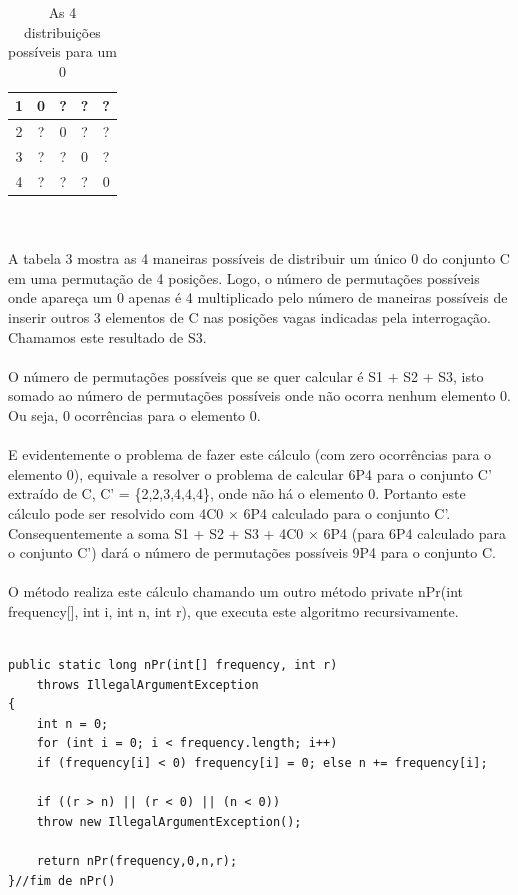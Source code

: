 \documentclass[a4paper,12pt,openany]{book}
\begin{document}
\begin{table}[h]
	\begin{center}
		\begin{tabular}{|c||c|c|c|c|}
			\hline
			1 & 0 & ? & ? & ?\\
			\hline
			2 & ? & 0 & ? & ? \\
			\hline
			3 & ? & ? & 0 & ? \\ 
			\hline
			4 & ? & ? & ? & 0 \\ 
			\hline
		\end{tabular}
	\end{center}
	\caption{As 4 distribuições possíveis para um 0}
\end{table}
\\ 
\\
A tabela 3 mostra as 4 maneiras possíveis de distribuir um único 0 do conjunto C em uma permutação de 4 posições. Logo, o número de permutações possíveis onde apareça um 0 apenas é 4 multiplicado pelo número de maneiras possíveis de inserir outros 3 elementos de C nas posições vagas indicadas pela interrogação. Chamamos este resultado de S3.
\\
\\
O número de permutações possíveis que se quer calcular é S1 + S2 + S3, isto somado ao número de permutações possíveis onde não ocorra nenhum elemento 0. Ou seja, 0 ocorrências para o elemento 0.
\\
\\
E evidentemente o problema de fazer este cálculo (com zero ocorrências para o elemento 0), equivale a resolver o problema de calcular 6P4 para o conjunto C' extraído de C, C' = \{2,2,3,4,4,4\}, onde não há o elemento 0. Portanto este cálculo pode ser resolvido com 4C0 $ \times $ 6P4 calculado para o conjunto C'. Consequentemente a soma S1 + S2 + S3 + 4C0 $ \times $ 6P4 (para 6P4 calculado para o conjunto C') dará o número de permutações possíveis 9P4 para o conjunto C.
\\
\\
O método realiza este cálculo chamando um outro método private nPr(int frequency[], int i, int n, int r), que executa este algoritmo recursivamente.
\\
\\
\begin{lstlisting}
public static long nPr(int[] frequency, int r)
	throws IllegalArgumentException
{
	int n = 0;
	for (int i = 0; i < frequency.length; i++)
	if (frequency[i] < 0) frequency[i] = 0; else n += frequency[i];
	
	if ((r > n) || (r < 0) || (n < 0))
	throw new IllegalArgumentException();
	
	return nPr(frequency,0,n,r);
}//fim de nPr()
\end{lstlisting}
\end{document}
